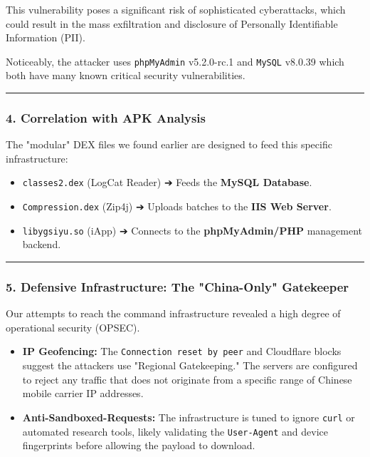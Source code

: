 \documentclass[
]{article}
\begin{document}
This vulnerability poses a significant risk of sophisticated
cyberattacks, which could result in the mass exfiltration and disclosure
of Personally Identifiable Information (PII).

Noticeably, the attacker uses \texttt{phpMyAdmin} v5.2.0-rc.1 and
\texttt{MySQL} v8.0.39 which both have many known critical security
vulnerabilities.

\begin{center}\rule{0.5\linewidth}{0.5pt}\end{center}

\subsubsection{4. Correlation with APK
Analysis}\label{4-correlation-with-apk-analysis}

The "modular" DEX files we found earlier are designed to feed this
specific infrastructure:

\begin{itemize}
\item
  \texttt{classes2.dex} (LogCat Reader) ➔ Feeds the \textbf{MySQL
  Database}.
\item
  \texttt{Compression.dex} (Zip4j) ➔ Uploads batches to the \textbf{IIS
  Web Server}.
\item
  \texttt{libygsiyu.so} (iApp) ➔ Connects to the \textbf{phpMyAdmin/PHP}
  management backend.
\end{itemize}

\begin{center}\rule{0.5\linewidth}{0.5pt}\end{center}

\subsubsection{5. Defensive Infrastructure: The "China-Only"
Gatekeeper}\label{5-defensive-infrastructure-the-china-only-gatekeeper}

Our attempts to reach the command infrastructure revealed a high degree
of operational security (OPSEC).

\begin{itemize}
\item
  \textbf{IP Geofencing:} The \texttt{Connection\ reset\ by\ peer} and
  Cloudflare blocks suggest the attackers use "Regional Gatekeeping."
  The servers are configured to reject any traffic that does not
  originate from a specific range of Chinese mobile carrier IP
  addresses.
\item
  \textbf{Anti-Sandboxed-Requests:} The infrastructure is tuned to
  ignore \texttt{curl} or automated research tools, likely validating
  the \texttt{User-Agent} and device fingerprints before allowing the
  payload to download.
\end{itemize}
\end{document}
